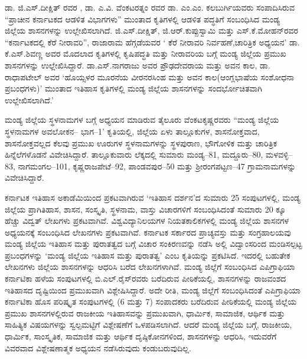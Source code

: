 ಡಾ. ಜಿ.ಎಸ್​.ದೀಕ್ಷಿತ್​ ರವರ , ಡಾ. ಎ.ವಿ. ವೆಂಕಟರತ್ನಂ ರವರ  ಡಾ. ಎಂ.ಎಂ. ಕಲಬುರ್ಗಿಯವರು ಸಂಪಾದಿಸಿರುವ “ಪ್ರಾಚೀನ ಕರ್ನಾಟಕದ ಆಡಳಿತ ವಿಭಾಗಗಳು” ಮುಂತಾದ ಕೃತಿಗಳಲ್ಲಿ ಆಡಳಿತ ಪದ್ಧತಿಗೆ ಸಂಬಂಧಿಸಿದ ಮಂಡ್ಯ ಜಿಲ್ಲೆಯ ಶಾಸನಗಳನ್ನು ಉಲ್ಲೇಖಿಸಲಾಗಿದೆ. ಜಿ.ಎಸ್​.ದೀಕ್ಷಿತ್​, ಜಿ.ಆರ್​.ಕುಪ್ಪುಸ್ವಾಮಿ ಮತ್ತು ಎಸ್​.ಕೆ.ಮೋಹನ್​ರವರ “ಕರ್ನಾಟಕದಲ್ಲಿ ಕೆರೆ ನೀರಾವರಿ”, ರಾಜಾರಾಮ ಹೆಗ್ಗಡೆಯವರ ‘ ಕೆರೆ ನೀರಾವರಿ ನಿರ್ವಹಣೆ,ಚಾರಿತ್ರಿಕ ಅಧ್ಯಯನ’ ಡಾ. ಕೆ.ಎಸ್​.ಶಿವಣ್ಣ ಅವರ  ಮೊದಲಾದ ಕೃತಿಗಳಲ್ಲಿ ಕೃಷಿಪದ್ಧತಿ ಮತ್ತು ನೀರಾವರಿಯ ಬಗ್ಗೆ ಮಂಡ್ಯ ಜಿಲ್ಲೆಯ ಪ್ರಮುಖ ಶಾಸನಗಳನ್ನು ಉಲ್ಲೇಖಿಸಿದ್ದಾರೆ. ಡಾ.ಎಸ್​.ನಾಗರಾಜು ಅವರ ಪ್ರೌಢದೇವರಾಯ ಮತ್ತು ಅವನ ಕಾಲ, ಡಾ. ರಾಧಾಪಟೇಲ್​ ಅವರ ‘ಹೊಯ್ಸಳರ ಮೂರನೆಯ ವೀರನರಸಿಂಹ ಮತ್ತು ಅವನ ಕಾಲ(ಆಂಗ್ಲಭಾಷೆಯ ಸಂಶೋಧನಾ ಪ್ರಬಂಧಗಳು)’ ಮುಂತಾದ ಇತಿಹಾಸ ಕೃತಿಗಳಲ್ಲಿ ಮಂಡ್ಯ ಜಿಲ್ಲೆಯ ಶಾಸನಗಳನ್ನು ಸಂದರ್ಭೋಚಿತವಾಗಿ ಉಲ್ಲೇಖಿಸಲಾಗಿದೆ.’

ಮಂಡ್ಯ ಜಿಲ್ಲೆಯ ಸ್ಥಳನಾಮಗಳ ಬಗ್ಗೆ ಅಧ್ಯಯನ ಮಾಡಿರುವ ತೈಲೂರು ವೆಂಕಟಕೃಷ್ಣರವರು “ಮಂಡ್ಯ ಜಿಲ್ಲೆಯ ಸ್ಥಳನಾಮಗಳ ಅವಲೋಕನ– ಭಾಗ–1’ ಕೃತಿಯಲ್ಲಿ, ಜಿಲ್ಲೆಯ ಏಳು ತಾಲ್ಲೂಕುಗಳ, ಶಾಸನೋಕ್ತವಾದ, ಶಾಸನೋಕ್ತವಲ್ಲದ ಕೆಲವು ಪ್ರಮುಖ ಊರುಗಳ ಸ್ಥಳನಾಮಗಳನ್ನು ಸ್ಥಳಪುರಾಣ, ಭೌಗೋಳಿಕ ಮತ್ತು ಚಾರಿತ್ರಿಕ ಹಿನ್ನೆಲೆಗಳೊಡನೆ ವಿವೇಚಿಸಿದ್ದಾರೆ. ತಾಲ್ಲೂಕುವಾರು ಲೆಕ್ಕದಲ್ಲಿ ಸುಮಾರು ಮಂಡ್ಯ–81, ಮದ್ದೂರು–80, ಮಳವಳ್ಳಿ–83, ನಾಗಮಂಗಲ–101, ಕೃಷ್ಣರಾಜಪೇಟೆ–92, ಪಾಂಡವಪುರ–50 ಮತ್ತು ಶ‍್ರೀರಂಗಪಟ್ಟಣ–47 ಗ್ರಾಮನಾಮಗಳನ್ನು ವಿವೇಚಿಸಿದ್ದಾರೆ.

ಕರ್ನಾಟಕ ಇತಿಹಾಸ ಅಕಾಡೆಮಿಯಿಂದ ಪ್ರಕಟವಾಗಿರುವ ‘ಇತಿಹಾಸ ದರ್ಶನ’ದ ಸುಮಾರು 25 ಸಂಪುಟಗಳಲ್ಲಿ, ಮಂಡ್ಯ ಜಿಲ್ಲೆಯ ಪ್ರಾಗಿತಿಹಾಸ, ಶಾಸನ, ಸಂಸ್ಕೃತಿ, ಸ್ಥಳನಾಮ, ವಾಸ್ತು ವಿಚಾರಗಳಿಗೆ ಸಂಬಂಧಿಸಿದಂತೆ ಸುಮಾರು 20 ಕ್ಕೂ ಹೆಚ್ಚು ವಿದ್ವತ್​ ಲೇಖಗಳು ಪ್ರಕಟವಾಗಿವೆ. ವಿಶ್ವವಿದ್ಯಾನಿಲಯಗಳ ನಿಯತಕಾಲಿಕಗಳಲ್ಲಿ ಮಂಡ್ಯ ಜಿಲ್ಲೆಯ ಶಾಸನಗಳ ಅಧ್ಯಯನಕ್ಕೆ ಸಂಬಂಧಿಸಿದ ಲೇಖನಗಳು ಪ್ರಕಟವಾಗಿವೆ. ಕರ್ನಾಟಕ ಸರ್ಕಾರದ ಪ್ರಾಚ್ಯವಸ್ತು ಮತ್ತು ಸಂಗ್ರಹಾಲಯವು ಮಂಡ್ಯ ಜಿಲ್ಲೆಯ ಇತಿಹಾಸ ಮತ್ತು ಪುರಾತತ್ವದ ಬಗ್ಗೆ ವಿಚಾರ ಸಂಕಿರಣವನ್ನು ನಡೆಸಿ ಅಲ್ಲಿ ವಿದ್ವಾಂಸರಿಂದ ಮಂಡಿಸಲ್ಪಟ್ಟ ಪ್ರಬಂಧಗಳನ್ನು ‘ಮಂಡ್ಯ ಜಿಲ್ಲೆಯ ಇತಿಹಾಸ ಮತ್ತು ಪುರಾತತ್ವ’ ಎಂಬ ಕೃತಿಯನ್ನು ಪ್ರಕಟಿಸಿದೆ. ಇದರಲ್ಲಿ ಬಹುತೇಕ ಲೇಖನಗಳು ಜಿಲ್ಲೆಯ ಶಾಸನಗಳನ್ನು ಆಧರಿಸಿ ಬರೆದ ಲೇಖನಗಳಾಗಿವೆ. ಮಂಡ್ಯ ಜಿಲ್ಲೆಗೆ ಸಂಬಂಧಿಸಿದ ಎಪಿಗ್ರಾಫಿಯಾ ಕರ್ನಾಟಿಕಾ ಹಳೆಯ ಸಂಪುಟಗಳಲ್ಲಿ ಬಿ.ಎಲ್​.ರೈಸ್​ರವರು ಬರೆದಿರುವ ಪೀಠಿಕೆಯಲ್ಲಿ, ಶಾಸನಗಳನ್ನು ರಾಜವಂಶದ ಇತಿಹಾಸದ ದೃಷ್ಟಿಯಿಂದ ಪ್ರಮುಖವಾಗಿ ವಿಶ್ಲೇಷಿಸಿದ್ದಾರೆ. ಅದೇ ರೀತಿ, ಮಂಡ್ಯ ಜಿಲ್ಲೆಗೆ ಸಂಬಂಧಿಸಿದಂತೆ ಎಪಿಗ್ರಾಫಿಯಾ ಕರ್ನಾಟಿಕಾ ಹೊಸ ಪರಿಷ್ಕೃತ ಸಂಪುಟಗಳಲ್ಲಿ (6 ಮತ್ತು 7) ಸಂಪಾದಕರು ಬರೆದಿರುವ ಪೀಠಿಕೆಯಲ್ಲಿ ಮಂಡ್ಯ ಜಿಲ್ಲೆಯ ಪ್ರಮುಖ ಶಾಸನಗಳಲ್ಲಿರುವ ರಾಜಕೀಯ ಇತಿಹಾಸವನ್ನು ಪ್ರಮುಖವಾಗಿ, ಧಾರ್ಮಿಕ, ಸಾಮಾಜಿಕ, ಆರ್ಥಿಕ ಮತ್ತು ಸಾಹಿತ್ಯಿಕ ವಿಷಯಗಳನ್ನು ಸ್ವಲ್ಪಮಟ್ಟಿಗೆ ವಿಶ್ಲೇಷಣೆಗೆ ಒಳಪಡಿಸಲಾಗಿದೆ. ಆದರೆ ಮಂಡ್ಯ ಜಿಲ್ಲೆಯ ಬಗ್ಗೆ, ರಾಜಕೀಯ, ಧಾರ್ಮಿಕ, ಸಾಂಸ್ಕೃತಿಕ, ಸಾಮಾಜಿಕ ಮತ್ತು ಆರ್ಥಿಕ ದೃಷ್ಠಿಕೋನಗಳಿಂದ, ಶಾಸನಗಳನ್ನು ಆಧರಿಸಿ, ಇದುವರೆಗೆ ವಿವರವಾದ ವಿಶ್ಲೇಷಣಾತ್ಮಕ ಅಧ್ಯಯನ ನಡೆಸಿರುವುದು ಕಂಡುಬರುವುದಿಲ್ಲ.

